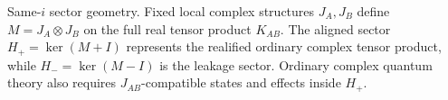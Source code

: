 \caption{Same-\(i\) sector geometry. Fixed local complex structures \(J_A,J_B\) define \(M=J_A\otimes J_B\) on the full real tensor product \(K_{AB}\). The aligned sector \(H_+=\ker(M+I)\) represents the realified ordinary complex tensor product, while \(H_-=\ker(M-I)\) is the leakage sector. Ordinary complex quantum theory also requires \(J_{AB}\)-compatible states and effects inside \(H_+\).}
